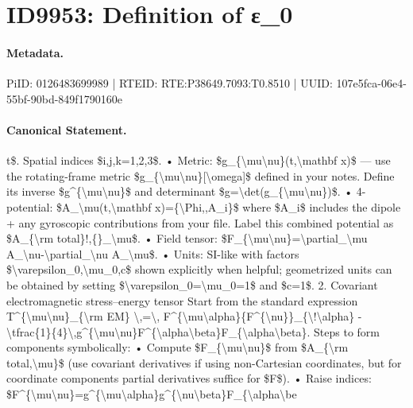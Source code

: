 \section*{ID9953: Definition of ε\_0}
\paragraph{Metadata.}
PiID: 0126483699989 | RTEID: RTE:P38649.7093:T0.8510 | UUID: 107e5fca-06e4-55bf-90bd-849f1790160e

\paragraph{Canonical Statement.}
t\$. Spatial indices \$i,j,k=1,2,3\$. • Metric: \$g\_\{\textbackslash{}mu\textbackslash{}nu\}(t,\textbackslash{}mathbf x)\$ — use the rotating-frame metric \$g\_\{\textbackslash{}mu\textbackslash{}nu\}[\textbackslash{}omega]\$ defined in your notes. Define its inverse \$g\textasciicircum{}\{\textbackslash{}mu\textbackslash{}nu\}\$ and determinant \$g=\textbackslash{}det(g\_\{\textbackslash{}mu\textbackslash{}nu\})\$. • 4-potential: \$A\_\textbackslash{}mu(t,\textbackslash{}mathbf x)=\{\textbackslash{}Phi,,A\_i\}\$ where \$A\_i\$ includes the dipole + any gyroscopic contributions from your file. Label this combined potential as \$A\_\{\textbackslash{}rm total\}!,\{\}\_\textbackslash{}mu\$. • Field tensor: \$F\_\{\textbackslash{}mu\textbackslash{}nu\}=\textbackslash{}partial\_\textbackslash{}mu A\_\textbackslash{}nu-\textbackslash{}partial\_\textbackslash{}nu A\_\textbackslash{}mu\$. • Units: SI-like with factors \$\textbackslash{}varepsilon\_0,\textbackslash{}mu\_0,c\$ shown explicitly when helpful; geometrized units can be obtained by setting \$\textbackslash{}varepsilon\_0=\textbackslash{}mu\_0=1\$ and \$c=1\$. 2. Covariant electromagnetic stress–energy tensor Start from the standard expression T\textasciicircum{}\{\textbackslash{}mu\textbackslash{}nu\}\_\{\textbackslash{}rm EM\} \textbackslash{},=\textbackslash{}, F\textasciicircum{}\{\textbackslash{}mu\textbackslash{}alpha\}\{F\textasciicircum{}\{\textbackslash{}nu\}\}\_\{\textbackslash{}!\textbackslash{}alpha\} - \textbackslash{}tfrac\{1\}\{4\}\textbackslash{},g\textasciicircum{}\{\textbackslash{}mu\textbackslash{}nu\}F\textasciicircum{}\{\textbackslash{}alpha\textbackslash{}beta\}F\_\{\textbackslash{}alpha\textbackslash{}beta\}. Steps to form components symbolically: • Compute \$F\_\{\textbackslash{}mu\textbackslash{}nu\}\$ from \$A\_\{\textbackslash{}rm total,\textbackslash{}mu\}\$ (use covariant derivatives if using non-Cartesian coordinates, but for coordinate components partial derivatives suffice for \$F\$). • Raise indices: \$F\textasciicircum{}\{\textbackslash{}mu\textbackslash{}nu\}=g\textasciicircum{}\{\textbackslash{}mu\textbackslash{}alpha\}g\textasciicircum{}\{\textbackslash{}nu\textbackslash{}beta\}F\_\{\textbackslash{}alpha\textbackslash{}be

